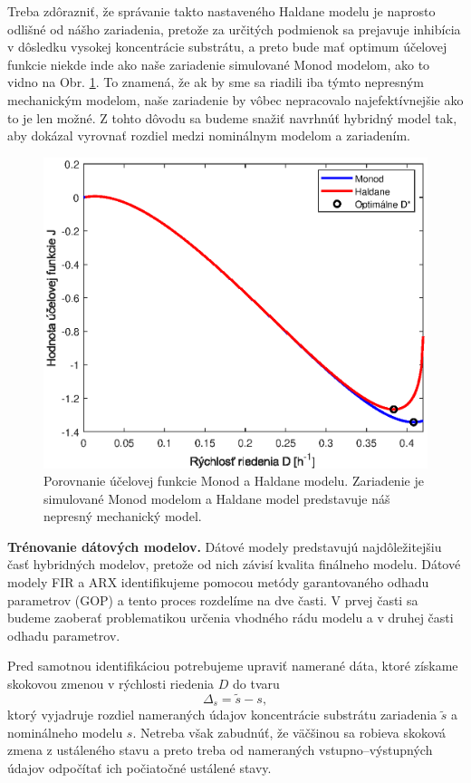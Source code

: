 Treba zdôrazniť, že správanie takto nastaveného Haldane modelu je naprosto odlišné od nášho zariadenia, pretože za určitých podmienok sa prejavuje inhibícia v dôsledku vysokej koncentrácie substrátu, a preto bude mať optimum účelovej funkcie niekde inde ako naše zariadenie simulované Monod modelom, ako to vidno na Obr. \ref{fig:cost_fun_comparison}. To znamená, že ak by sme sa riadili iba týmto nepresným mechanickým modelom, naše zariadenie by vôbec nepracovalo najefektívnejšie ako to je len možné. Z tohto dôvodu sa budeme snažiť navrhnúť hybridný model tak, aby dokázal vyrovnať rozdiel medzi nominálnym modelom a zariadením. 
\begin{figure}
	\centering
	\includegraphics[width=0.7\linewidth]{images/cost_fun_comparison}
	\caption{Porovnanie účelovej funkcie Monod a Haldane modelu. Zariadenie je simulované Monod modelom a Haldane model predstavuje náš nepresný mechanický model.}
	\label{fig:cost_fun_comparison}
\end{figure}

\textbf{Trénovanie dátových modelov.} Dátové modely predstavujú najdôležitejšiu časť hybridných modelov, pretože od nich závisí kvalita finálneho modelu. Dátové modely FIR a ARX identifikujeme pomocou metódy garantovaného odhadu parametrov (GOP) a tento proces rozdelíme na dve časti. V prvej časti sa budeme zaoberať problematikou určenia vhodného rádu modelu a v druhej časti odhadu parametrov.

Pred samotnou identifikáciou potrebujeme upraviť namerané dáta, ktoré získame skokovou zmenou v rýchlosti riedenia $ D $ do tvaru 
\begin{equation}
	\Delta_{s} = \tilde{s} - s,
\end{equation} 
ktorý vyjadruje rozdiel nameraných údajov koncentrácie substrátu zariadenia $ \tilde{s} $ a nominálneho modelu $ s $. Netreba však zabudnúť, že väčšinou sa robieva skoková zmena z ustáleného stavu a preto treba od nameraných vstupno--výstupných údajov odpočítať ich počiatočné ustálené stavy.

